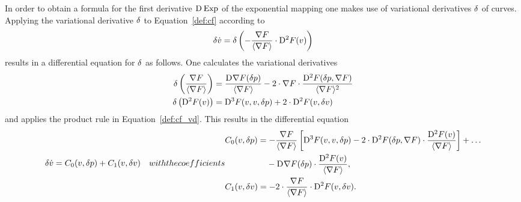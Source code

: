 In order to obtain a formula for the first derivative $ \mathrm{D}^{  } \operatorname{Exp}  $
of the exponential mapping one makes use
of variational derivatives $ \delta $ of curves.
Applying the variational derivative $ \delta $
to Equation~\eqref{def:cf} according to
\begin{align}
    \delta \dot{ v }  =
    \delta \left(
        -\frac{ \nabla F }{ \langle  \nabla F  \rangle }  \cdot
        \mathrm{D}^{ 2 }F( v ) \right)
    \label{def:cf_vd}
\end{align}
results in a differential equation for $ \delta $ as follows.
One calculates the variational derivatives
\begin{subequations}
    \begin{align}
    \delta \left( \frac{ \nabla F  }{ \langle  \nabla F   \rangle } \right)  &=
    \frac{ \mathrm{D}^{  } \nabla F  ( \delta p ) }{ \langle  \nabla F   \rangle }  -
    2 \cdot \nabla F  \cdot \frac{ \mathrm{D}^{  2  } F ( \delta p, \nabla F  ) }{ \langle  \nabla F   \rangle^2 }\\
    \delta\left( \mathrm{D}^{  2  } F ( v ) \right)  &=
    \mathrm{D}^{  3  } F ( v, v, \delta p )  +
    2 \cdot \mathrm{D}^{  2  } F ( v, \delta v )
    \end{align}
\end{subequations}
and applies the product rule in Equation~\eqref{def:cf_vd}.
This results in the differential equation
\begin{subequations}
    \label{def:cf_vd_dgl}
    \begin{align}
        \vardiff \dot{ v }   &=
        C_0( v, \vardiff p )  +  C_1( v, \vardiff v )
        \label{def:cf_vd_dgl:a}
    \end{align}
    with the coefficients
    \begin{align}
        &\begin{aligned}
            C_0( v, \vardiff p )   &=
            - \frac{ \grad{F} }{ \skaq{ \grad{F} } }
            \left[  \diff{3}{F}( v, v, \vardiff p )  -
            2 \mult \diff{2}{F}( \vardiff p, \grad{F} ) \mult
            \frac{ \diff{2}{F}( v ) }{ \skaq{\grad{F}} }  \right]  +  \dots\\
            &\hphantom{={}} - \diff{}{\grad{F}}( \vardiff p ) \mult
            \frac{ \diff{2}{F}( v ) }{ \skaq{\grad{F}} } ,
        \end{aligned}
        \label{def:cf_vd_dgl:b}
        \\
        &C_1( v, \vardiff v )   =
        - 2 \mult \frac{ \grad{F} }{ \skaq{ \grad{F} } }  \mult
        \diff{2}{F}( v, \vardiff v ) .
        \label{def:cf_vd_dgl:c}
    \end{align}
\end{subequations}


